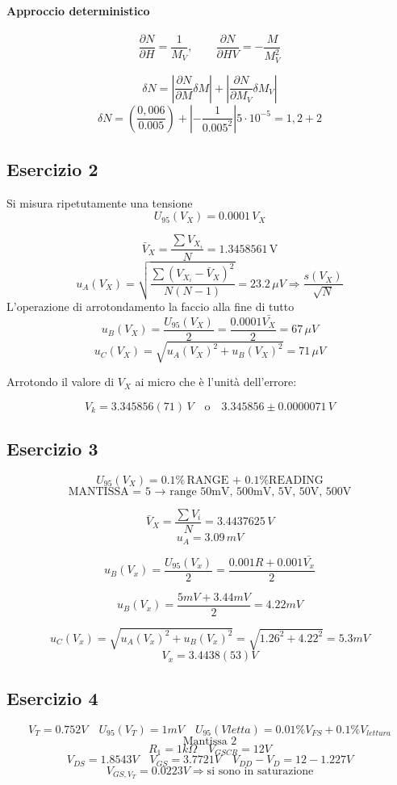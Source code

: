 \paragraph{Approccio deterministico}
\[
\frac{\partial N}{\partial H} = \frac{1}{M_V}, \qquad \frac{\partial N}{\partial HV} = -\frac{M}{M_V^2}
\]

\[
\delta N = \left| \frac{\partial N}{\partial M} \delta M\right|  + \left| \frac{\partial N}{\partial M_V}\delta M_V \right| 
\]
\[
\delta N = \left( \frac{0,006}{0.005} \right) + \left| -\frac{1}{0.005^2} \right| 5\cdot10^{-5} = 1,2+2
\]

\vspace{1em}

\subsection{Esercizio 2}
Si misura ripetutamente una tensione
\[
U_{95}(V_X) = 0.0001\,V_X
\]

\[
\bar{V}_X = \frac{\sum V_{X_i}}{N} = 1.3458561\,\text{V}
\]
\[
u_A(V_X) = \sqrt{\frac{\sum (V_{X_i} - \bar{V}_X)^2}{N(N-1)}} = 23.2\,\mu V
\Rightarrow \frac{s(V_X)}{\sqrt{N}}
\]
L'operazione di arrotondamento la faccio alla fine di tutto
\[
u_B(V_X) = \frac{U_{95}(V_X)}{2} = \frac{0.0001 \bar{V_X}}{2} = 67\,\mu V
\]
\[
u_C(V_X) = \sqrt{u_A(V_X)^2 + u_B(V_X)^2} = 71\,\mu V
\]

\noindent
Arrotondo il valore di $V_X$  ai micro che è l'unità dell’errore:

\[
V_k = 3.345856(71)\,V \quad \text{o} \quad 3.345856 \pm 0.0000071\,V
\]

\subsection{Esercizio 3}
\[
U_{95}(V_X) = 0.1\%\,\text{RANGE + 0.1\% READING}
\]
\[
\text{MANTISSA = 5 → range 50mV, 500mV, 5V, 50V, 500V}
\]

\[
\bar{V}_X = \frac{\sum V_i}{N} = 3.4437625\,V
\]
\[
u_A = 3.09\,mV
\]

\[
u_B(V_x) = \frac{U_{95}(V_x)}{2} = \frac{0.001R + 0.001 \bar{V_x}}{2}
\]

\noindent
\[
u_B(V_x) = \frac{5mV + 3.44mV}{2} = 4.22mV
\]

\[
u_C(V_x) = \sqrt{u_A(V_x)^2 + u_B(V_x)^2} = \sqrt{1.26^2 + 4.22^2} = 5.3mV
\]
\[
V_x = 3.4438(53)V
\]
\subsection{Esercizio 4}
\[
V_T = 0.752V \quad U_{95}(V_T)=1mV \quad U_{95}(Vletta)=0.01\% V_{FS}+0.1\% V_{lettura}
\]
\[
\text{Mantissa } 2
\]
\[
R_1=1k\Omega \quad V_{GSCR}=12V
\]
\[
V_{DS}=1.8543V \quad V_{GS}=3.7721V \quad V_{DD}-V_D=12-1.227V
\]
\[
V_{GS,V_T}=0.0223V \Rightarrow \text{si sono in saturazione}
\]

